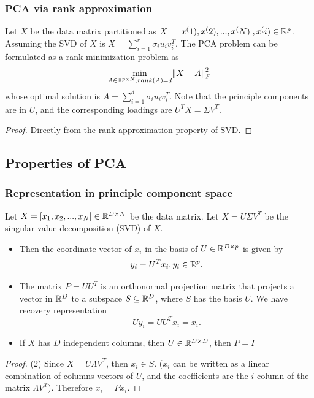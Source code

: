 \begin{refsection}
\subsubsection{PCA via rank approximation}
\begin{theorem}
Let $X$ be the data matrix partitioned as $X=[x^(1),x^(2),...,x^(N)],x^(i)\in \mathbb{R}^p$. Assuming the SVD of $X$ is $X=\sum_{i=1}^r \sigma_i u_iv_i^T$. The PCA problem can be formulated as a rank minimization problem as
$$\min_{A\in \mathbb{R}^{p\times N}, rank(A)=d} \norm{X-A}^2_F$$
whose optimal solution is $A = \sum_{i=1}^d \sigma_i u_iv_i^T$. Note that the principle components are in $U$, and the corresponding loadings are $U^TX = \Sigma V^T$.
\end{theorem}
\begin{proof}
Directly from the rank approximation property of SVD.
\end{proof}



\subsection{Properties of PCA}
\subsubsection{Representation in principle component space}

\begin{lemma}
Let $X = [x_1,x_2,...,x_N] \in \mathbb{R}^{D\times N}$ be the data matrix. Let $X = U\Sigma V^T$ be the singular value decomposition (SVD) of $X$. 
\begin{itemize}
	\item Then the coordinate vector of $x_i$ in the basis of $U\in \mathbb{R}^{D\times p}$ is given by
	$$y_i = U^Tx_i, y_i\in \mathbb{R}^p.$$
	\item The matrix $P=UU^T$ is an orthonormal projection matrix that projects a vector in $\mathbb{R}^D$ to a subspace $S\subseteq \mathbb{R}^D$, where $S$ has the basis $U$. We have recovery representation
	$$Uy_i = UU^Tx_i = x_i.$$
	\item If $X$ has $D$ independent columns, then $U\in \mathbb{R}^{D\times D}$, then $P = I$
\end{itemize}
\end{lemma}
\begin{proof}

(2) Since $X = U\Lambda V^T$, then $x_i \in S$. ($x_i$ can be written as a linear combination of columns vectors of $U$, and the coefficients are the $i$ column of the matrix $\Lambda V^T$). Therefore $x_i = Px_i$. 	
\end{proof}



\end{refsection}
